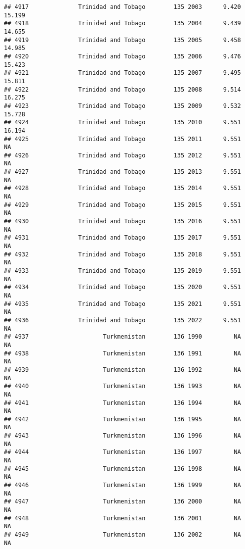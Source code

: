 \documentclass[
]{article}
\begin{document}
\begin{verbatim}
## 4917              Trinidad and Tobago        135 2003      9.420     15.199
## 4918              Trinidad and Tobago        135 2004      9.439     14.655
## 4919              Trinidad and Tobago        135 2005      9.458     14.985
## 4920              Trinidad and Tobago        135 2006      9.476     15.423
## 4921              Trinidad and Tobago        135 2007      9.495     15.811
## 4922              Trinidad and Tobago        135 2008      9.514     16.275
## 4923              Trinidad and Tobago        135 2009      9.532     15.728
## 4924              Trinidad and Tobago        135 2010      9.551     16.194
## 4925              Trinidad and Tobago        135 2011      9.551         NA
## 4926              Trinidad and Tobago        135 2012      9.551         NA
## 4927              Trinidad and Tobago        135 2013      9.551         NA
## 4928              Trinidad and Tobago        135 2014      9.551         NA
## 4929              Trinidad and Tobago        135 2015      9.551         NA
## 4930              Trinidad and Tobago        135 2016      9.551         NA
## 4931              Trinidad and Tobago        135 2017      9.551         NA
## 4932              Trinidad and Tobago        135 2018      9.551         NA
## 4933              Trinidad and Tobago        135 2019      9.551         NA
## 4934              Trinidad and Tobago        135 2020      9.551         NA
## 4935              Trinidad and Tobago        135 2021      9.551         NA
## 4936              Trinidad and Tobago        135 2022      9.551         NA
## 4937                     Turkmenistan        136 1990         NA         NA
## 4938                     Turkmenistan        136 1991         NA         NA
## 4939                     Turkmenistan        136 1992         NA         NA
## 4940                     Turkmenistan        136 1993         NA         NA
## 4941                     Turkmenistan        136 1994         NA         NA
## 4942                     Turkmenistan        136 1995         NA         NA
## 4943                     Turkmenistan        136 1996         NA         NA
## 4944                     Turkmenistan        136 1997         NA         NA
## 4945                     Turkmenistan        136 1998         NA         NA
## 4946                     Turkmenistan        136 1999         NA         NA
## 4947                     Turkmenistan        136 2000         NA         NA
## 4948                     Turkmenistan        136 2001         NA         NA
## 4949                     Turkmenistan        136 2002         NA         NA

\end{verbatim}
\end{document}
